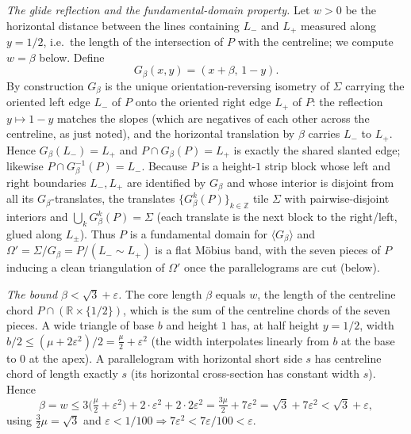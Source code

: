 \documentclass[12pt]{article}
\newcommand{\R}{\mathbb{R}}
\newcommand{\Z}{\mathbb{Z}}
\newcommand{\eps}{\varepsilon}
\newcommand{\Sig}{\Sigma}
\begin{document}
\smallskip
\emph{The glide reflection and the fundamental-domain property.}
Let $w>0$ be the horizontal distance between the lines containing $L_-$ and
$L_+$ measured along $y=1/2$, i.e.\ the length of the intersection of $P$
with the centreline; we compute $w=\beta$ below. Define
\[
G_\beta(x,y)=(x+\beta,\,1-y).
\]
By construction $G_\beta$ is the unique orientation-reversing isometry of
$\Sig$ carrying the oriented left edge $L_-$ of $P$ onto the oriented right
edge $L_+$ of $P$: the reflection $y\mapsto1-y$ matches the slopes (which
are negatives of each other across the centreline, as just noted), and the
horizontal translation by $\beta$ carries $L_-$ to $L_+$. Hence
$G_\beta(L_-)=L_+$ and $P\cap G_\beta(P)=L_+$ is exactly the shared
slanted edge; likewise $P\cap G_\beta^{-1}(P)=L_-$. Because $P$ is a
height-$1$ strip block whose left and right boundaries $L_-,L_+$ are
identified by $G_\beta$ and whose interior is disjoint from all its
$G_\beta$-translates, the translates $\{G_\beta^k(P)\}_{k\in\Z}$ tile
$\Sig$ with pairwise-disjoint interiors and $\bigcup_kG_\beta^k(P)=\Sig$
(each translate is the next block to the right/left, glued along $L_\pm$).
Thus $P$ is a fundamental domain for $\langle G_\beta\rangle$ and
$\Omega'=\Sig/G_\beta=P/(L_-\!\sim\!L_+)$ is a flat M\"obius band, with the
seven pieces of $P$ inducing a clean triangulation of $\Omega'$ once the
parallelograms are cut (below).

\smallskip
\emph{The bound $\beta<\sqrt3+\eps$.}
The core length $\beta$ equals $w$, the length of the centreline chord
$P\cap(\R\times\{1/2\})$, which is the sum of the centreline chords of the
seven pieces. A wide triangle of base $b$ and height $1$ has, at half
height $y=1/2$, width $b/2\le(\mu+2\eps^2)/2=\tfrac\mu2+\eps^2$ (the width
interpolates linearly from $b$ at the base to $0$ at the apex). A
parallelogram with horizontal short side $s$ has centreline chord of
length exactly $s$ (its horizontal cross-section has constant width $s$).
Hence
\begin{equation}\label{eq:beta}
\beta=w\le 3\Big(\tfrac\mu2+\eps^2\Big)+2\cdot\eps^2+2\cdot 2\eps^2
=\tfrac{3\mu}{2}+7\eps^2=\sqrt3+7\eps^2<\sqrt3+\eps,
\end{equation}
using $\tfrac32\mu=\sqrt3$ and $\eps<1/100\Rightarrow 7\eps^2<7\eps/100<\eps$.
\end{document}
